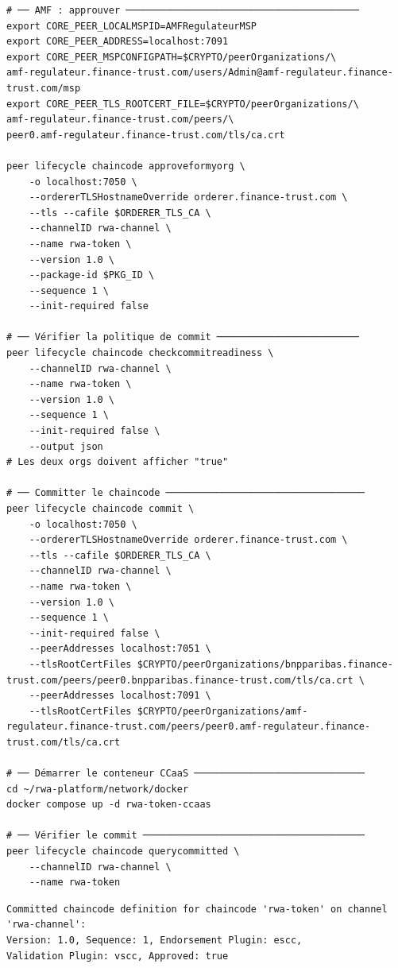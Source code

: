 \documentclass[12pt,a4paper,french]{article}
\begin{document}
\begin{lstlisting}[style=bash, caption={Lifecycle chaincode (version 1.0)}]
# ── AMF : approuver ─────────────────────────────────────────
export CORE_PEER_LOCALMSPID=AMFRegulateurMSP
export CORE_PEER_ADDRESS=localhost:7091
export CORE_PEER_MSPCONFIGPATH=$CRYPTO/peerOrganizations/\
amf-regulateur.finance-trust.com/users/Admin@amf-regulateur.finance-trust.com/msp
export CORE_PEER_TLS_ROOTCERT_FILE=$CRYPTO/peerOrganizations/\
amf-regulateur.finance-trust.com/peers/\
peer0.amf-regulateur.finance-trust.com/tls/ca.crt

peer lifecycle chaincode approveformyorg \
    -o localhost:7050 \
    --ordererTLSHostnameOverride orderer.finance-trust.com \
    --tls --cafile $ORDERER_TLS_CA \
    --channelID rwa-channel \
    --name rwa-token \
    --version 1.0 \
    --package-id $PKG_ID \
    --sequence 1 \
    --init-required false

# ── Vérifier la politique de commit ─────────────────────────
peer lifecycle chaincode checkcommitreadiness \
    --channelID rwa-channel \
    --name rwa-token \
    --version 1.0 \
    --sequence 1 \
    --init-required false \
    --output json
# Les deux orgs doivent afficher "true"

# ── Committer le chaincode ───────────────────────────────────
peer lifecycle chaincode commit \
    -o localhost:7050 \
    --ordererTLSHostnameOverride orderer.finance-trust.com \
    --tls --cafile $ORDERER_TLS_CA \
    --channelID rwa-channel \
    --name rwa-token \
    --version 1.0 \
    --sequence 1 \
    --init-required false \
    --peerAddresses localhost:7051 \
    --tlsRootCertFiles $CRYPTO/peerOrganizations/bnpparibas.finance-trust.com/peers/peer0.bnpparibas.finance-trust.com/tls/ca.crt \
    --peerAddresses localhost:7091 \
    --tlsRootCertFiles $CRYPTO/peerOrganizations/amf-regulateur.finance-trust.com/peers/peer0.amf-regulateur.finance-trust.com/tls/ca.crt

# ── Démarrer le conteneur CCaaS ──────────────────────────────
cd ~/rwa-platform/network/docker
docker compose up -d rwa-token-ccaas

# ── Vérifier le commit ───────────────────────────────────────
peer lifecycle chaincode querycommitted \
    --channelID rwa-channel \
    --name rwa-token
\end{lstlisting}

\begin{successbox}
\begin{verbatim}
Committed chaincode definition for chaincode 'rwa-token' on channel 'rwa-channel':
Version: 1.0, Sequence: 1, Endorsement Plugin: escc,
Validation Plugin: vscc, Approved: true
\end{verbatim}
\end{successbox}
\end{document}
